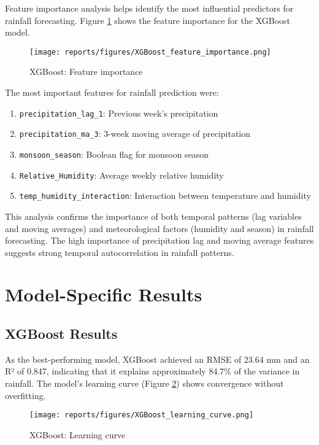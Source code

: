 \documentclass[12pt]{article}
\begin{document}
Feature importance analysis helps identify the most influential predictors for rainfall forecasting. Figure \ref{fig:xgb_feature_importance} shows the feature importance for the XGBoost model.

\begin{figure}[h]
\centering
\texttt{[image: reports/figures/XGBoost\_feature\_importance.png]}
\caption{XGBoost: Feature importance}
\label{fig:xgb_feature_importance}
\end{figure}

The most important features for rainfall prediction were:
\begin{enumerate}
    \item \texttt{precipitation\_lag\_1}: Previous week's precipitation
    \item \texttt{precipitation\_ma\_3}: 3-week moving average of precipitation
    \item \texttt{monsoon\_season}: Boolean flag for monsoon season
    \item \texttt{Relative\_Humidity}: Average weekly relative humidity
    \item \texttt{temp\_humidity\_interaction}: Interaction between temperature and humidity
\end{enumerate}

This analysis confirms the importance of both temporal patterns (lag variables and moving averages) and meteorological factors (humidity and season) in rainfall forecasting. The high importance of precipitation lag and moving average features suggests strong temporal autocorrelation in rainfall patterns.

\section{Model-Specific Results}
\label{sec:model_specific_results}

\subsection{XGBoost Results}
\label{subsec:xgboost_results}

As the best-performing model, XGBoost achieved an RMSE of 23.64 mm and an R² of 0.847, indicating that it explains approximately 84.7\% of the variance in rainfall. The model's learning curve (Figure \ref{fig:xgb_learning_curve}) shows convergence without overfitting.

\begin{figure}[h]
\centering
\texttt{[image: reports/figures/XGBoost\_learning\_curve.png]}
\caption{XGBoost: Learning curve}
\label{fig:xgb_learning_curve}
\end{figure}
\end{document}
